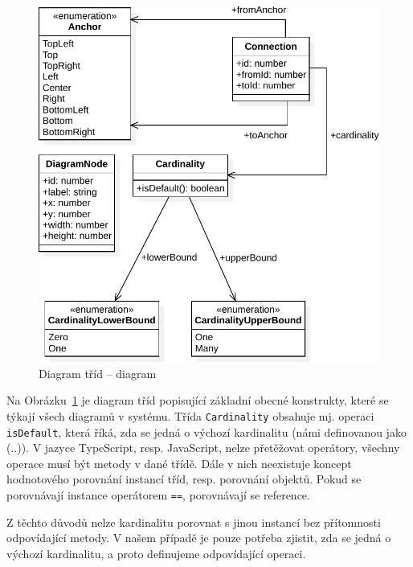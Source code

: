 \begin{figure}[!htb]
  \centering
  \includegraphics[width=\maxwidth{\textwidth}]{../img/diagrams/diagram-class-diagram.pdf}
  \caption{Diagram tříd -- diagram}
  \label{fig:diagram-class-diagram}
\end{figure}

Na Obrázku~\ref{fig:diagram-class-diagram} je diagram tříd popisující základní obecné konstrukty, které se týkají všech diagramů v systému.
Třída \texttt{Cardinality} obsahuje mj. operaci \texttt{isDefault}, která říká, zda se jedná o výchozí kardinalitu (námi definovanou jako (\one{}..\one{})).
V jazyce TypeScript, resp. JavaScript, nelze přetěžovat operátory, všechny operace musí být metody v dané třídě.
Dále v nich neexistuje koncept hodnotového porovnání instancí tříd, resp. porovnání objektů.
Pokud se porovnávají instance operátorem \texttt{==}, porovnávají se reference.

Z těchto důvodů nelze kardinalitu porovnat s jinou instancí bez přítomnosti odpovídající metody.
V našem případě je pouze potřeba zjistit, zda se jedná o výchozí kardinalitu, a proto definujeme odpovídající operaci.

